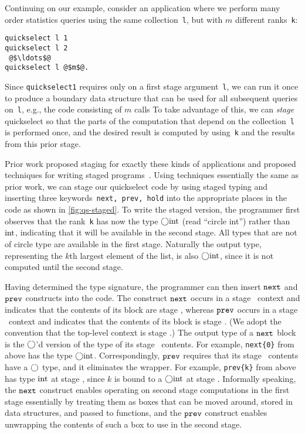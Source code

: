 Continuing on our example, consider an application where we perform
many order statistics queries using the same collection~\texttt{l}, but
 with $m$ different ranks~\texttt{k}:
%
\begin{lstlisting}
quickselect l 1
quickselect l 2
 @$\ldots$@ 
quickselect l @$m$@.
\end{lstlisting}
%
Since \texttt{quickselect1} requires only on a first stage
argument~\texttt{l}, we can run it once to produce a boundary data
structure that can be used for all subsequent queries on~\texttt{l},
e.g., the code consisting of $m$ calls To take advantage of this, we
can {\em stage} quickselect so that the parts of the computation that
depend on the collection~\texttt{l} is performed once, and the desired
result is computed by using~\texttt{k} and the results from this prior
stage.


Prior work proposed staging for exactly these kinds of applications
and proposed techniques for writing staged
programs~\cite{staging}. Using techniques essentially the same as
prior work, we can stage our quickselect code by using staged typing
and inserting three keywords~\texttt{next, prev, hold} into the
appropriate places in the code as shown in \ref{fig:qs-staged}. To
write the staged version, the programmer first observes that the
rank~\texttt{k} has now the type $\bigcirc{\rm int}$ (read ``circle int'')
rather than ${\rm int}$, indicating that it will be available in the
second stage.  All types that are not of circle type are available in
the first stage.  Naturally the output type, representing the $k$th
largest element of the list, is also $\bigcirc{\rm int}$, since it is not
computed until the second stage. 

Having determined the type signature,
the programmer can then insert ${\tt next}$ and ${\tt prev}$ constructs into the
code. The construct ${\tt next}$ occurs in a stage \bbone\ context and
indicates that the contents of its block are stage \bbtwo, whereas
${\tt prev}$ occurs in a stage \bbtwo\ context and indicates that the
contents of its block is stage \bbone.  (We adopt the convention that
the top-level context is stage \bbone.)  The output type of a ${\tt next}$
block is the $\bigcirc$'d version of the type of its stage
\bbtwo\ contents.  For example, \verb|next{0}| from above has the type
$\bigcirc{\rm int}$.  Correspondingly, ${\tt prev}$ requires that its stage
\bbone\ contents have a $\bigcirc$ type, and it eliminates the wrapper.
For example, \verb|prev{k}| from above has type ${\rm int}$ at stage
\bbtwo, since $k$ is bound to a $\bigcirc{\rm int}$ at stage
\bbone. Informally speaking, the
${\tt next}$ construct enables operating on second stage computations in
the first stage essentially by treating them as boxes that can be
moved around, stored in data structures, and passed to functions, and
the ${\tt prev}$ construct enables unwrapping the contents of such a box to
use in the second stage. 


